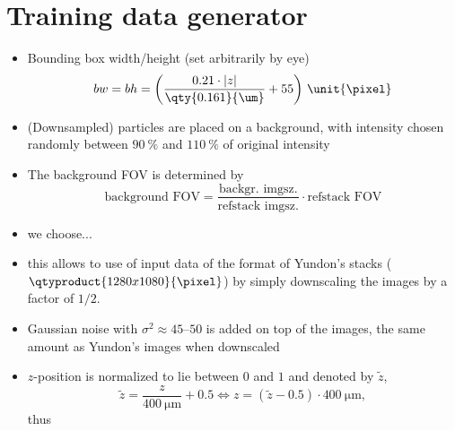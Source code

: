 \documentclass[
  headings=standardclasses,
  a4paper,
  parskip=half,  %
  cleardoublepage=plain,  %
  DIV=18,
  fontsize=10pt
  ]{scrartcl}
\begin{document}
    \section*{Training data generator}
        \begin{itemize}
            \item Bounding box width/height (set arbitrarily by eye)
            \begin{equation*}
                bw = bh = \left(\frac{0.21\cdot|z|}{\qty{0.161}{\um}}+55\right)  \,\unit{\pixel}
            \end{equation*}
            \item (Downsampled) particles are placed on a background, with intensity chosen randomly between $\qty{90}{\percent}$ and $\qty{110}{\percent}$ of original intensity
            \item The background FOV is determined by \begin{equation*}
                \text{background FOV}=\frac{\text{backgr. imgsz.}}{\text{refstack imgsz.}}\cdot \text{refstack FOV}
            \end{equation*}
            \item we choose...
            \item this allows to use of input data of the format of Yundon's stacks ($\qtyproduct{1280x1080}{\pixel}$) by simply downscaling the images by a factor of $1/2$.
        \item Gaussian noise with $\sigma^2 \approx \numrange{45}{50}$ is added on top of the images, the same amount as Yundon's images when downscaled
        \item $z$-position is normalized to lie between $0$ and $1$ and denoted by $\tilde{z}$,
        \begin{equation*}
            \tilde{z} = \frac{z}{\qty{400}{\um}}+\num{0.5}
            \Leftrightarrow z = (\tilde{z} - \num{0.5}) \cdot \qty{400}{\um},
        \end{equation*}
        thus
        \begin{table}[H]
            

\end{table}
\end{itemize}
\end{document}
